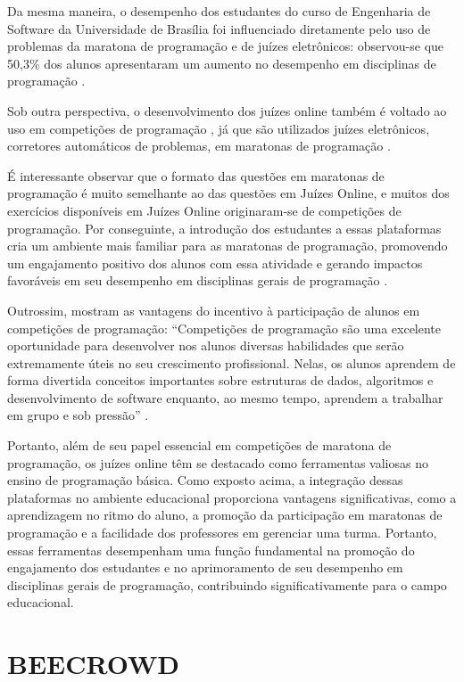 Da mesma maneira, o desempenho dos estudantes do curso de Engenharia de Software da Universidade de Brasília foi influenciado diretamente pelo uso de problemas da maratona de programação e de juízes eletrônicos: observou-se que 50,3\% dos alunos apresentaram um aumento no desempenho em disciplinas de programação \cite[p.~218]{salescosta}.

Sob outra perspectiva, o desenvolvimento dos juízes online também é voltado ao uso em competições de programação \cite[p.~964-965]{santosribeiro}, já que são utilizados juízes eletrônicos, corretores automáticos de problemas, em maratonas de programação \cite[p.~34]{lima2023}. 

É interessante observar que o formato das questões em maratonas de programação é muito semelhante ao das questões em Juízes Online, e muitos dos exercícios disponíveis em Juízes Online originaram-se de competições de programação. Por conseguinte, a introdução dos estudantes a essas plataformas cria um ambiente mais familiar para as maratonas de programação, promovendo um engajamento positivo dos alunos com essa atividade e gerando impactos favoráveis em seu desempenho em disciplinas gerais de programação \cite[p.~33-34]{lima2023}.

Outrossim, \textcite[p.~2]{camposferreira} mostram as vantagens do incentivo à participação de alunos em competições de programação: “Competições de programação são uma excelente oportunidade para desenvolver nos alunos diversas habilidades que serão extremamente úteis no seu crescimento profissional. Nelas, os alunos aprendem de forma divertida conceitos importantes sobre estruturas de dados, algoritmos e desenvolvimento de software enquanto, ao mesmo tempo, aprendem a trabalhar em grupo e sob pressão” \cite[p.~2]{camposferreira}.

Portanto, além de seu papel essencial em competições de maratona de programação, os juízes online têm se destacado como ferramentas valiosas no ensino de programação básica. Como exposto acima, a integração dessas plataformas no ambiente educacional proporciona vantagens significativas, como a aprendizagem no ritmo do aluno, a promoção da participação em maratonas de programação e a facilidade dos professores em gerenciar uma turma. Portanto, essas ferramentas desempenham uma função fundamental na promoção do engajamento dos estudantes e no aprimoramento de seu desempenho em disciplinas gerais de programação, contribuindo significativamente para o campo educacional.


\section{BEECROWD}

